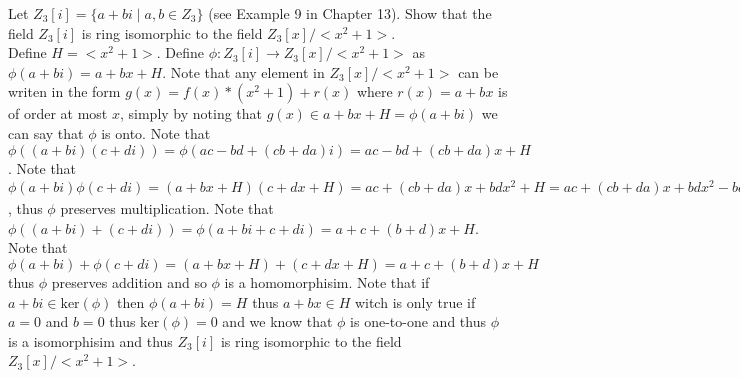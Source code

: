 \documentclass[12pt]{article}
\makeatletter
\theoremstyle{homework}
\newenvironment{exercise}[1]
{\def\@currentlabel{#1}\exercisecore}
{\endexercisecore}
\makeatother
\begin{document}
\begin{exercise}{15.12}
Let $Z_3[i] = \{a + bi \mid a, b \in Z_3 \}$ (see Example 9 in Chapter 13). Show that the field $Z_3[i]$ is ring isomorphic to the field $Z_3[x]/<x^2 + 1>$.\\
Define $H=<x^2+1>$.  Define $\phi:Z_3[i]\rightarrow Z_3[x]/<x^2 + 1>$ as $\phi(a+bi)= a+bx+H$.  Note that any element in $Z_3[x]/<x^2 + 1>$ can be writen in the form $g(x)=f(x)*(x^2+1)+r(x)$ where $r(x)=a+bx$ is of order at most $x$, simply by noting that $g(x)\in a+bx+H=\phi(a+bi)$ we can say that $\phi$ is onto.  Note that $\phi((a+bi)(c+di))=\phi(ac-bd+(cb+da)i)=ac-bd+(cb+da)x+H$.  Note that $\phi(a+bi)\phi(c+di)=(a+bx+H)(c+dx+H)=ac+(cb+da)x+bdx^2+H=ac+(cb+da)x+bdx^2-bd(x^2+1)+H=ac-bd+(cb+da)x+H$, thus $\phi$ preserves multiplication.  Note that $\phi((a+bi)+(c+di))=\phi(a+bi+c+di)=a+c+(b+d)x+H$.  Note that $\phi(a+bi)+\phi(c+di)=(a+bx+H)+(c+dx+H)=a+c+(b+d)x+H$ thus $\phi$ preserves addition and so $\phi$ is a homomorphisim.  Note that if $a+bi\in\text{ker}(\phi)$ then $\phi(a+bi)=H$ thus $a+bx\in H$ witch is only true if $a=0$ and $b=0$ thus $\text{ker}(\phi)=0$ and we know that $\phi$ is one-to-one and thus $\phi$ is a isomorphisim and thus $Z_3[i]$ is ring isomorphic to the field $Z_3[x]/<x^2 + 1>$.
\end{exercise}
\end{document}
